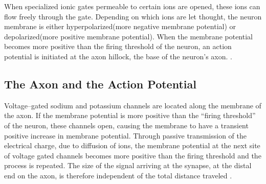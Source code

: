 		When specialized ionic gates permeable to certain ions are opened, these ions can flow freely through the gate.
		Depending on which ions are let thought, the neuron membrane is either hyperpolarized(more negative membrane potential) or depolarized(more positive membrane potential).
		When the membrane potential becomes more positive than the firing threshold of the neuron, an action potential is initiated at the axon hillock, the base of the neuron's axon. %
		\cite{PrinciplesOfNeuralScience4edKAP09, PurvesNeuroscience, PrinciplesOfNeuralScience4edKAP10}. 








	\subsection{The Axon and the Action Potential}
	\label{ssecTheAxonAndActionPotential}
		Voltage--gated sodium and potassium channels are located along the membrane of the axon.
		If the membrane potential is more positive than the ``firing threshold'' of the neuron, these channels open, causing the membrane to have a transient positive increase in membrane potential.
		Through passive transmission of the electrical charge, due to diffusion of ions, the membrane potential at the next site of voltage gated channels becomes more positive than the firing threshold and the process is repeated.
		The size of the signal arriving at the synapse, at the distal end on the axon, is therefore independent of the total distance traveled
		\cite{PrinciplesOfNeuralScience4edKAP09}.



